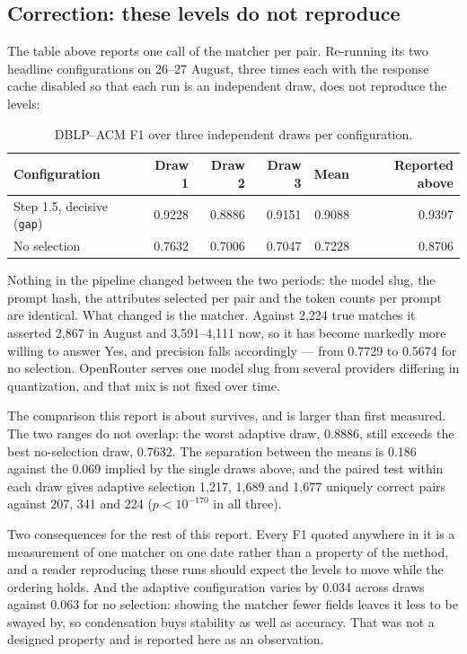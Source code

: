 \documentclass[11pt]{article}
\begin{document}
\subsection{Correction: these levels do not reproduce}
\label{sec:correction}

The table above reports one call of the matcher per pair. Re-running its two headline
configurations on 26--27 August, three times each with the response cache disabled so that
each run is an independent draw, does not reproduce the levels:

\begin{table}[h]
\centering
\begin{tabular}{lrrrrr}
\toprule
Configuration & Draw 1 & Draw 2 & Draw 3 & Mean & Reported above \\
\midrule
Step 1.5, decisive (\texttt{gap}) & 0.9228 & 0.8886 & 0.9151 & 0.9088 & 0.9397 \\
No selection                      & 0.7632 & 0.7006 & 0.7047 & 0.7228 & 0.8706 \\
\bottomrule
\end{tabular}
\caption{DBLP--ACM F1 over three independent draws per configuration.}
\end{table}

Nothing in the pipeline changed between the two periods: the model slug, the prompt hash,
the attributes selected per pair and the token counts per prompt are identical. What changed
is the matcher. Against 2{,}224 true matches it asserted 2{,}867 in August and
3{,}591--4{,}111 now, so it has become markedly more willing to answer Yes, and precision
falls accordingly --- from 0.7729 to 0.5674 for no selection. OpenRouter serves one model
slug from several providers differing in quantization, and that mix is not fixed over time.

The comparison this report is about survives, and is larger than first measured. The two
ranges do not overlap: the worst adaptive draw, 0.8886, still exceeds the best no-selection
draw, 0.7632. The separation between the means is 0.186 against the 0.069 implied by the
single draws above, and the paired test within each draw gives adaptive selection 1{,}217,
1{,}689 and 1{,}677 uniquely correct pairs against 207, 341 and 224 ($p < 10^{-170}$ in all
three).

Two consequences for the rest of this report. Every F1 quoted anywhere in it is a
measurement of one matcher on one date rather than a property of the method, and a reader
reproducing these runs should expect the levels to move while the ordering holds. And the
adaptive configuration varies by 0.034 across draws against 0.063 for no selection: showing
the matcher fewer fields leaves it less to be swayed by, so condensation buys stability as
well as accuracy. That was not a designed property and is reported here as an observation.
\end{document}
